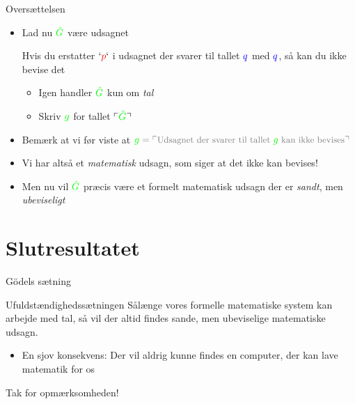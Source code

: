 \documentclass{beamer}
\newcommand{\godel}[1]{\ulcorner #1 \urcorner}
\begin{document}
\begin{frame}{Oversættelsen}
  \begin{itemize}
  \item Lad nu $\color{green}\hat G$ være udsagnet
    \begin{adjustwidth}{0.5cm}{0pt}
    {\small\color{darkgray}
      Hvis du erstatter $`{\color{red} p}`$ i udsagnet der svarer til tallet $\color{blue}q$ med $\color{blue}q$, så kan du ikke bevise det
    }
    \end{adjustwidth}
    \begin{itemize}
      \pause\item Igen handler $\color{green}\hat G$ kun om \textit{tal}
      \pause\item Skriv $\color{green}g$ for tallet $\godel{{\color{green}\hat G}}$
    \end{itemize}
  \pause\item Bemærk at vi før viste at $\small\color{gray}{\color{green}g}=\godel{\text{Udsagnet der svarer til tallet } {\color{green}g}\text{ kan ikke bevises}}$
    \pause\item Vi har altså et \textit{matematisk} udsagn, som siger at det ikke kan bevises!
    \pause\item Men nu vil $\color{green}\hat G$ præcis være et formelt matematisk udsagn der er \textit{sandt}, men \textit{ubeviseligt}
  \end{itemize}
\end{frame}

\section{Slutresultatet}
\begin{frame}{Gödels sætning}
  \begin{block}{Ufuldstændighedssætningen}
    Sålænge vores formelle matematiske system kan arbejde med tal, så vil der altid findes sande, men ubeviselige matematiske udsagn.
  \end{block}
  \begin{itemize}
    \pause\item En sjov konsekvens: Der vil aldrig kunne findes en computer, der kan lave matematik for os
  \end{itemize}
  \begin{center}
    \pause\LARGE Tak for opmærksomheden!
  \end{center}
\end{frame}
\end{document}

